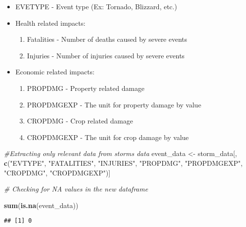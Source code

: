 \documentclass[
]{article}
\newenvironment{Shaded}{\begin{snugshade}}{\end{snugshade}}
\newcommand{\CommentTok}[1]{\textcolor[rgb]{0.56,0.35,0.01}{\textit{#1}}}
\newcommand{\DataTypeTok}[1]{\textcolor[rgb]{0.13,0.29,0.53}{#1}}
\newcommand{\DecValTok}[1]{\textcolor[rgb]{0.00,0.00,0.81}{#1}}
\newcommand{\KeywordTok}[1]{\textcolor[rgb]{0.13,0.29,0.53}{\textbf{#1}}}
\newcommand{\NormalTok}[1]{#1}
\newcommand{\OperatorTok}[1]{\textcolor[rgb]{0.81,0.36,0.00}{\textbf{#1}}}
\newcommand{\OtherTok}[1]{\textcolor[rgb]{0.56,0.35,0.01}{#1}}
\newcommand{\StringTok}[1]{\textcolor[rgb]{0.31,0.60,0.02}{#1}}
\providecommand{\tightlist}{%
  \setlength{\itemsep}{0pt}\setlength{\parskip}{0pt}}
\begin{document}
\begin{itemize}
\tightlist
\item
  EVETYPE - Event type (Ex: Tornado, Blizzard, etc.)
\item
  Health related impacts:

  \begin{enumerate}
  \def\labelenumi{\arabic{enumi}.}
  \tightlist
  \item
    Fatalities - Number of deaths caused by severe events
  \item
    Injuries - Number of injuries caused by severe events
  \end{enumerate}
\item
  Economic related impacts:

  \begin{enumerate}
  \def\labelenumi{\arabic{enumi}.}
  \tightlist
  \item
    PROPDMG - Property related damage
  \item
    PROPDMGEXP - The unit for property damage by value
  \item
    CROPDMG - Crop related damage
  \item
    CROPDMGEXP - The unit for crop damage by value
  \end{enumerate}
\end{itemize}

\begin{Shaded}
\begin{Highlighting}[]
\CommentTok{#Extracting only relevant data from storms data}
\NormalTok{event_data <-}\StringTok{ }\NormalTok{storm_data[, }\KeywordTok{c}\NormalTok{(}\StringTok{"EVTYPE"}\NormalTok{, }\StringTok{"FATALITIES"}\NormalTok{, }\StringTok{"INJURIES"}\NormalTok{, }\StringTok{"PROPDMG"}\NormalTok{, }\StringTok{"PROPDMGEXP"}\NormalTok{, }\StringTok{"CROPDMG"}\NormalTok{, }\StringTok{"CROPDMGEXP"}\NormalTok{)]}

\CommentTok{# Checking for NA values in the new dataframe}

\KeywordTok{sum}\NormalTok{(}\KeywordTok{is.na}\NormalTok{(event_data))}
\end{Highlighting}
\end{Shaded}

\begin{verbatim}
## [1] 0
\end{verbatim}

\begin{Shaded}
\end{Shaded}
\end{document}
